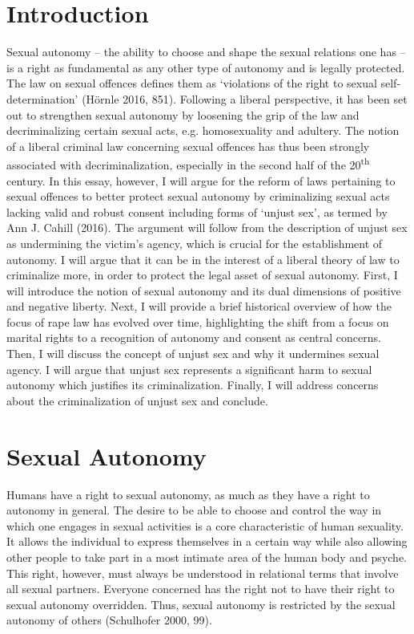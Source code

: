 \section*{Introduction}
Sexual autonomy -- the ability to choose and shape the sexual relations
one has -- is a right as fundamental as any other type of autonomy and
is legally protected. The law on sexual offences defines them as
`violations of the right to sexual self-determination' (Hörnle 2016,
851). Following a liberal perspective, it has been set out to strengthen
sexual autonomy by loosening the grip of the law and decriminalizing
certain sexual acts, e.g. homosexuality and adultery. The notion of a
liberal criminal law concerning sexual offences has thus been strongly
associated with decriminalization, especially in the second half of the
20\textsuperscript{th} century. In this essay, however, I will argue for
the reform of laws pertaining to sexual offences to better protect
sexual autonomy by criminalizing sexual acts lacking valid and robust
consent including forms of `unjust sex', as termed by Ann J. Cahill
(2016). The argument will follow from the description of unjust sex as
undermining the victim's agency, which is crucial for the establishment
of autonomy. I will argue that it can be in the interest of a liberal
theory of law to criminalize more, in order to protect the legal asset
of sexual autonomy. First, I will introduce the notion of sexual
autonomy and its dual dimensions of positive and negative liberty. Next,
I will provide a brief historical overview of how the focus of rape law
has evolved over time, highlighting the shift from a focus on marital
rights to a recognition of autonomy and consent as central concerns.
Then, I will discuss the concept of unjust sex and why it undermines
sexual agency. I will argue that unjust sex represents a significant
harm to sexual autonomy which justifies its criminalization. Finally, I
will address concerns about the criminalization of unjust sex and
conclude.

\section*{Sexual Autonomy}
Humans have a right to sexual autonomy, as much as they have a right to
autonomy in general. The desire to be able to choose and control the way
in which one engages in sexual activities is a core characteristic of
human sexuality. It allows the individual to express themselves in a
certain way while also allowing other people to take part in a most
intimate area of the human body and psyche. This right, however, must
always be understood in relational terms that involve all sexual
partners. Everyone concerned has the right not to have their right to
sexual autonomy overridden. Thus, sexual autonomy is restricted by the
sexual autonomy of others (Schulhofer 2000, 99).

